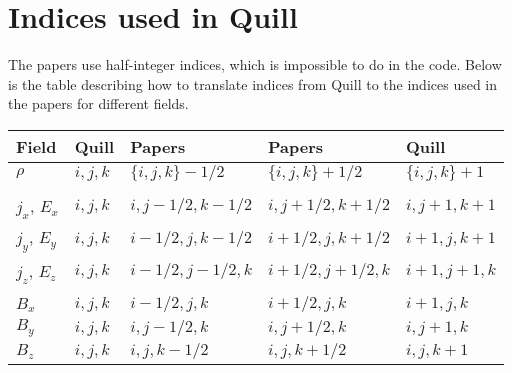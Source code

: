 \documentclass[12pt,a4paper,DIV=calc]{scrartcl}
\begin{document}
\section{Indices used in Quill}\label{sec:indices}
The papers use half-integer indices, which is impossible to do in the code.
Below is the table describing how to translate indices from Quill to the indices used in the papers for different fields.

\begin{tabular}{ l | l l | l l }
    Field & Quill &  Papers & Papers & Quill\\
    \hline
    $\rho$ & $i,j,k$ & $\lbrace i,j,k\rbrace-1/2$ & $\lbrace i,j,k\rbrace + 1/2$ & $\lbrace i,j,k\rbrace+1$ \\
    &&&&\\
    $j_x$, $E_x$ & $i,j,k$ & $i,j-1/2,k-1/2$ & $i,j+1/2,k+1/2$ & $i,j+1,k+1$ \\
    $j_y$, $E_y$ & $i,j,k$ & $i-1/2,j,k-1/2$ & $i+1/2,j,k+1/2$ & $i+1,j,k+1$ \\
    $j_z$, $E_z$ & $i,j,k$ & $i-1/2,j-1/2,k$ & $i+1/2,j+1/2,k$ & $i+1,j+1,k$ \\
    &&&&\\
    $B_x$ & $i,j,k$ & $i-1/2,j,k$ & $i+1/2,j,k$ & $i+1,j,k$\\
    $B_y$ & $i,j,k$ & $i,j-1/2,k$ & $i,j+1/2,k$ & $i,j+1,k$\\
    $B_z$ & $i,j,k$ & $i,j,k-1/2$ & $i,j,k+1/2$ & $i,j,k+1$
\end{tabular}
\end{document}
